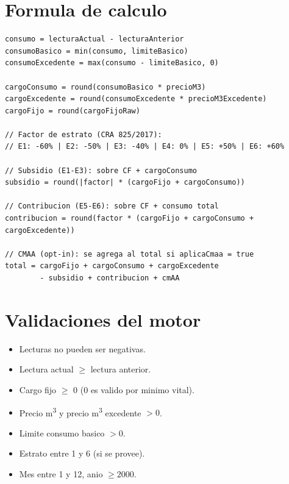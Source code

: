 \documentclass[11pt,a4paper,oneside]{report}
\begin{document}
\section{Formula de calculo}

\begin{lstlisting}[caption={Formula del motor tarifario CRA},label={lst:formula}]
consumo = lecturaActual - lecturaAnterior
consumoBasico = min(consumo, limiteBasico)
consumoExcedente = max(consumo - limiteBasico, 0)

cargoConsumo = round(consumoBasico * precioM3)
cargoExcedente = round(consumoExcedente * precioM3Excedente)
cargoFijo = round(cargoFijoRaw)

// Factor de estrato (CRA 825/2017):
// E1: -60% | E2: -50% | E3: -40% | E4: 0% | E5: +50% | E6: +60%

// Subsidio (E1-E3): sobre CF + cargoConsumo
subsidio = round(|factor| * (cargoFijo + cargoConsumo))

// Contribucion (E5-E6): sobre CF + consumo total
contribucion = round(factor * (cargoFijo + cargoConsumo + cargoExcedente))

// CMAA (opt-in): se agrega al total si aplicaCmaa = true
total = cargoFijo + cargoConsumo + cargoExcedente
        - subsidio + contribucion + cmAA
\end{lstlisting}

\section{Validaciones del motor}

\begin{itemize}[leftmargin=*]
    \item Lecturas no pueden ser negativas.
    \item Lectura actual $\geq$ lectura anterior.
    \item Cargo fijo $\geq$ 0 (0 es valido por minimo vital).
    \item Precio m\textsuperscript{3} y precio m\textsuperscript{3} excedente $> 0$.
    \item Limite consumo basico $> 0$.
    \item Estrato entre 1 y 6 (si se provee).
    \item Mes entre 1 y 12, anio $\geq 2000$.
\end{itemize}

\end{document}
